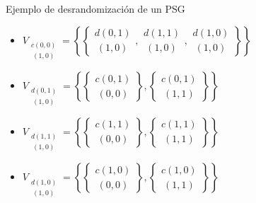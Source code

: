 \documentclass{beamer}
\begin{document}
\begin{frame}{Ejemplo de desrandomizaci\'on de un PSG}
	\begin{itemize}
		\item $V_{\substack{c(0,0) \\ \ (1,0)}} = \left\{\left\{\substack{d(0,1) \\ \ (1,0)}, \substack{d(1,1) \\ \ (1,0)}, \substack{d(1,0) \\ \ (1,0)}\right\}\right\}$
		      \pause
		\item $V_{\substack{d(0,1) \\ \ (1,0)}} = \left\{\left\{\substack{c(0,1) \\ \ (0,0)}\right\}, \left\{\substack{c(0,1) \\ \ (1,1)}\right\}\right\}$
		      \pause
		\item $V_{\substack{d(1,1) \\ \ (1,0)}} = \left\{\left\{\substack{c(1,1) \\ \ (0,0)}\right\}, \left\{\substack{c(1,1) \\ \ (1,1)}\right\}\right\}$
		      \pause
		\item $V_{\substack{d(1,0) \\ \ (1,0)}} = \left\{\left\{\substack{c(1,0) \\ \ (0,0)}\right\}, \left\{\substack{c(1,0) \\ \ (1,1)}\right\}\right\}$
	\end{itemize}
\end{frame}
\end{document}
